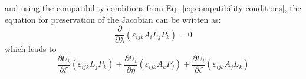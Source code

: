  and using the compatibility conditions from Eq.~\ref{eq:compatibility-conditions}, the equation for preservation of the Jacobian can be written as:
\[\frac{\partial }{{\partial \lambda }}\left( {{\varepsilon _{ijk}}{A_i}{L_j}{P_k}} \right) = 0\]
which leads to 
\[\frac{{\partial {U_i}}}{{\partial \xi }}\left( {{\varepsilon _{ijk}}{L_j}{P_k}} \right) + \frac{{\partial {U_i}}}{{\partial \eta }}\left( {{\varepsilon _{ijk}}{A_k}{P_j}} \right) + \frac{{\partial {U_i}}}{{\partial \zeta }}\left( {{\varepsilon _{ijk}}{A_j}{L_k}} \right)\]

